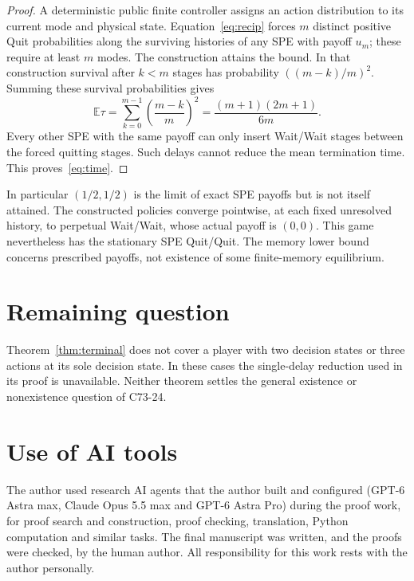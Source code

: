 \documentclass[11pt]{article}
\newcommand{\E}{\mathbb E}
\begin{document}
\begin{proof}
A deterministic public finite controller assigns an action distribution
to its current mode and physical state. Equation~\eqref{eq:recip} forces
$m$ distinct positive Quit probabilities along the surviving histories
of any SPE with payoff $u_m$; these require at least $m$ modes.
The construction attains the bound. In that construction survival
after $k<m$ stages has probability $((m-k)/m)^2$. Summing these survival
probabilities gives
\[
 \E\tau=\sum_{k=0}^{m-1}\left(\frac{m-k}{m}\right)^2
       =\frac{(m+1)(2m+1)}{6m}.
\]
Every other SPE with the same payoff can only insert Wait/Wait stages
between the forced quitting stages. Such delays cannot reduce the
mean termination time. This proves~\eqref{eq:time}.
\end{proof}

In particular $(1/2,1/2)$ is the limit of exact SPE payoffs but is not
itself attained. The constructed policies converge pointwise, at each
fixed unresolved history, to perpetual Wait/Wait, whose actual payoff
is $(0,0)$. This game nevertheless has the stationary SPE Quit/Quit.
The memory lower bound concerns prescribed payoffs, not existence of
some finite-memory equilibrium.

\section{Remaining question}
Theorem~\ref{thm:terminal} does not cover a player with two decision states
or three actions at its sole decision state. In these cases the
single-delay reduction used in its proof is unavailable. Neither theorem
settles the general existence or nonexistence question of C73-24.

\section*{Use of AI tools}
The author used research AI agents that the author built and configured (GPT-6 Astra max,
Claude Opus 5.5 max and GPT-6 Astra Pro) during the proof work, for proof search and
construction, proof checking, translation, Python computation and similar tasks. The final
manuscript was written, and the proofs were checked, by the human author. All responsibility
for this work rests with the author personally.
\end{document}
